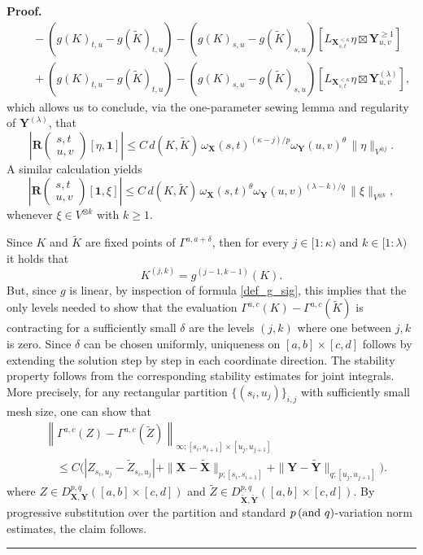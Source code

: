 \documentclass{article}%
\newenvironment{proof}[1][Proof]{\noindent\textbf{#1.} }{\ \rule{0.5em}{0.5em}}
\begin{document}
\begin{proof}
\begin{align*}
& \quad-\left(g(K)_{t,u} - g(\tilde{K})_{t,u} \right) - \left( g(K)_{s,u} - g(\tilde{K})_{s,u}\right) \left[L_{\mathbf{X}^{< \kappa}_{s,t}}\eta \boxtimes \mathbf{Y}^{\ge 1}_{u,v} \right]\\
&\quad +\left(g(K)_{t,u} - g(\tilde{K})_{t,u} \right) - \left( g(K)_{s,u} - g(\tilde{K})_{s,u}\right) \left[L_{\mathbf{X}^{< \kappa}_{s,t}}\eta \boxtimes \mathbf{Y}^{(\lambda)}_{u,v} \right],
\end{align*}
which allows us to conclude, via the one-parameter sewing lemma and regularity of $\mathbf{Y}^{(\lambda)}$, that
\[
\left|\mathbf{R} \begin{pmatrix} s,t \\ u,v \end{pmatrix}[\eta, \mathbf{1}] \right|
\leq C\, d(K,\tilde{K})\,\omega_\mathbf{X}(s,t)^{(\kappa-j)/p}\omega_{\mathbf{Y}}(u,v)^{\theta}\,\|\eta\|_{V^{\otimes j}}.
\]
A similar calculation yields
\[
\left|\mathbf{R} \begin{pmatrix} s,t \\ u,v \end{pmatrix}[\mathbf{1}, \xi] \right|
\leq C\, d(K,\tilde{K})\,\omega_\mathbf{X}(s,t)^{\theta}\omega_{\mathbf{Y}}(u,v)^{(\lambda-k)/q}\,\|\xi\|_{V^{\otimes k}},
\]
whenever $\xi \in V^{\otimes k}$ with $k \geq 1$.

Since \(K\) and \(\tilde K\) are fixed points of \(\Gamma^{a,a+\delta}\),
then for every $j \in [1 :\kappa)$ and $k \in [1 :\lambda)$ it holds that
\[
K^{(j,k)} = g^{(j-1, k-1)}(K).
\]
But, since $g$ is linear, by inspection of formula \eqref{def_g_sig}, this implies that the only levels needed to show that the evaluation $\Gamma^{a, c}(K) - \Gamma^{a,c}(\tilde{K})$ is contracting for a sufficiently small $\delta$ are the levels $(j, k)$ where one between $j, k$ is zero.\newline
Since $\delta$ can be chosen uniformly, uniqueness on $[a,b]\times [c,d]$  follows by extending the solution step by step in each coordinate direction. \newline
The stability property follows from the corresponding stability estimates for joint integrals. 
More precisely, for any rectangular partition $\{(s_i,u_j)\}_{i,j}$ with sufficiently small mesh size, one can show that
\begin{align*}
&\left\| \Gamma^{a, c}(Z) - \Gamma^{a,c}(\tilde Z) \right\|_{\infty; [s_i,s_{i+1}] \times [u_j,u_{j+1}]} \\
&\quad \leq C
\Big(
|Z_{s_i,u_j}-\tilde{Z}_{s_i,u_j}| 
+ \|\mathbf{X}-\tilde{\mathbf{X}}\|_{p;[s_i,s_{i+1}]} + \|\mathbf{Y}-\tilde{\mathbf{Y}}\|_{q;[u_j,u_{j+1}]} \Big) .
\end{align*}
where $Z \in D^{p,q}_{\mathbf{X}, \mathbf{Y}}([a,b] \times [c,d])$ and $\tilde{Z} \in D^{p,q}_{\tilde{ \mathbf{X}}, \tilde{\mathbf{Y}}}([a,b] \times [c,d])$.\newline
By progressive substitution over the partition and standard $p \thinspace (\text{and }q)$-variation norm estimates, the claim follows.
\end{proof}
\end{document}
